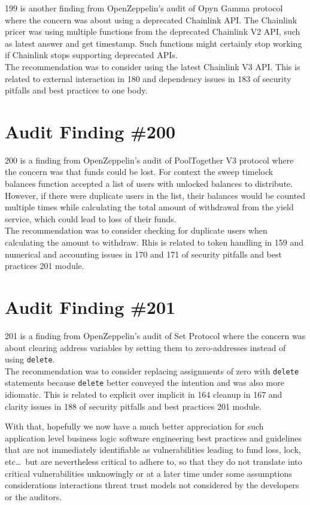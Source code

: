 199 is another finding from OpenZeppelin's audit of Opyn Gamma protocol where the concern was about using a deprecated Chainlink API. The Chainlink pricer was using multiple functions from the deprecated Chainlink V2 API, such as latest answer and get timestamp. Such functions might certainly stop working if Chainlink stops supporting deprecated APIs.\\

The recommendation was to consider using the latest Chainlink V3 API. This is related to external interaction in 180 and dependency issues in 183 of security pitfalls and best practices to one body.

\section{Audit Finding \#200}

200 is a finding from OpenZeppelin's audit of PoolTogether V3 protocol where the concern was that funds could be lost. For context the sweep timelock balances function accepted a list of users with unlocked balances to distribute. However, if there were duplicate users in the list, their balances would be counted multiple times while calculating the total amount of withdrawal from the yield service, which could lead to loss of their funds.\\

The recommendation was to consider checking for duplicate users when calculating the amount to withdraw. Rhis is related to token handling in 159 and numerical and accounting issues in 170 and 171 of security pitfalls and best practices 201 module.

\section{Audit Finding \#201}

201 is a finding from OpenZeppelin's audit of Set Protocol where the concern was about clearing address variables by setting them to zero-addresses instead of using \verb|delete|.\\

The recommendation was to consider replacing assignments of zero with \verb|delete| statements because \verb|delete| better conveyed the intention and was also more idiomatic. This is related to explicit over implicit in 164 cleanup in 167 and clarity issues in 188 of security pitfalls and best practices 201 module.

\vfill

With that, hopefully we now have a much better appreciation for such application level business logic software engineering best practices and guidelines that are not immediately identifiable as vulnerabilities leading to fund loss, lock, etc\dots\, but are nevertheless critical to adhere to, so that they do not translate into critical vulnerabilities unknowingly or at a later time under some assumptions considerations interactions threat trust models not considered by the developers or the auditors.